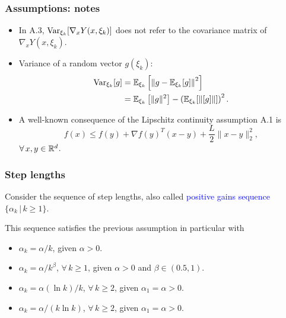 \documentclass{beamer}
\begin{document}
\begin{frame}
\frametitle{Assumptions: notes}

\begin{itemize}
\item 
In A.3, $\operatorname{Var}_{\xi_k} [\nabla_x Y(x, \xi_k)]$ does not refer to the covariance matrix of $\nabla_x Y(x,  \xi_k)$.
\item
Variance of a random vector $g(\xi_k)$:
\begin{align*}
\operatorname{Var}_{\xi_k} [g] &= {\mathbb{E}}_{\xi_k} \left[ \left \| g - {\mathbb{E}}_{\xi_k} [g] \right \|^2 \right] \\
& = {\mathbb{E}}_{\xi_k} \left[ \| g \|^2 \right] - \left( {\mathbb{E}}_{\xi_k} [ \| [g] \| ] \right)^2.
\end{align*}
\item
A well-known consequence of the Lipschitz continuity assumption A.1 is
$$
f(x) \leq f(y) + \nabla f(y)^T ( x - y ) + \frac{L}{2} \| x - y \|^2_2,
$$
$\forall\, x, y \in {\mathbb{R}}^d$.
\end{itemize}

\end{frame}

\begin{frame}
\frametitle{Step lengths}

Consider the sequence of step lengths, also called \textcolor{blue}{positive gains sequence} $\{ \alpha_k \,|\, k \geq 1 \}$.

\mbox{}

This sequence satisfies the previous assumption in particular with
\begin{itemize}
\item 
$\alpha_k = \alpha/k$, given $\alpha > 0$.
\item 
$\alpha_k = \alpha/k^{\beta}$, $\forall\, k \geq 1$, given $\alpha > 0$ and $\beta \in (0.5, 1)$.
\item
$\alpha_k = \alpha(\ln k)/k$, $\forall\, k \geq 2$, given $\alpha_1 = \alpha > 0$.
\item
$\alpha_k = \alpha/(k \ln k)$, $\forall\, k \geq 2$, given $\alpha_1 = \alpha > 0$.
\end{itemize}

\end{frame}
\end{document}
